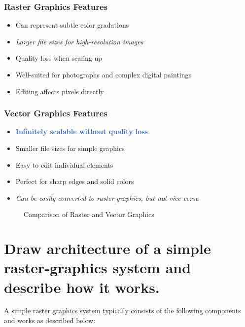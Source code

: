 \documentclass[12pt]{article}
\begin{document}
\subsubsection{Raster Graphics Features}
\begin{itemize}
    \item Can represent subtle color gradations
    \item \textcolor{note}{\textit{Larger file sizes for high-resolution images}}
    \item Quality loss when scaling up
    \item Well-suited for photographs and complex digital paintings
    \item Editing affects pixels directly
\end{itemize}

\subsubsection{Vector Graphics Features}
\begin{itemize}
    \item \textcolor{highlight}{\textbf{Infinitely scalable without quality loss}}
    \item Smaller file sizes for simple graphics
    \item Easy to edit individual elements
    \item Perfect for sharp edges and solid colors
    \item \textcolor{note}{\textit{Can be easily converted to raster graphics, but not vice versa}}
\end{itemize}

\begin{figure}[h]
    \centering
    \caption{Comparison of Raster and Vector Graphics}
    \label{fig:raster-vs-vector}
\end{figure}

\section{Draw architecture of a simple raster-graphics system and describe how it works.}\label{sec:2}
A simple raster graphics system typically consists of the following components and works as described below:
\end{document}
